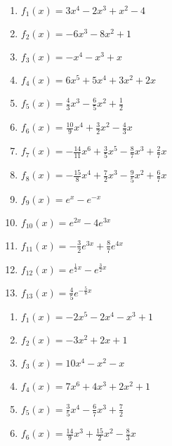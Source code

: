 \begin{minipage}{\textwidth}
	\begin{minipage}{.4\textwidth}
		\begin{Exercise}[title={\raggedright Bestimme jeweils eine Stammfunktion.}, label=stammfunktionenA1]
			\begin{enumerate}[label=\alph*)]
				\item \(f_1(x)=3x^4-2x^3+x^2-4\)
				\item \(f_2(x)=-6x^3-8x^2+1\)
				\item \(f_3(x)=-x^4-x^3+x\)
				\item \(f_4(x)=6x^5+5x^4+3x^2+2x\)
				\item \(f_5(x)=\frac{4}{3}x^3-\frac{6}{5}x^2+\frac{1}{2}\)
				\item \(f_6(x)=\frac{10}{9}x^4+\frac{3}{2}x^2-\frac{4}{3}x\)
				\item \(f_7(x)=-\frac{14}{11}x^6+\frac{3}{5}x^5-\frac{8}{7}x^3+\frac{2}{7}x\)
				\item \(f_8(x)=-\frac{15}{8}x^4+\frac{7}{2}x^3-\frac{9}{5}x^2+\frac{6}{7}x\)
				\item \(f_9(x)=e^x-e^{-x}\)
				\item \(f_{10}(x)=e^{2x}-4e^{3x}\)
				\item \(f_{11}(x)=-\frac{3}{2}e^{3x}+\frac{8}{7}e^{4x}\)
				\item \(f_{12}(x)=e^{\frac{1}{2}x}-e^{\frac{3}{2}x}\)
				\item \(f_{13}(x)=\frac{4}{5}e^{-\frac{5}{8}x}\)
			\end{enumerate}
		\end{Exercise}
	\end{minipage}
	\begin{minipage}{.1\textwidth}
		\phantom{text}
	\end{minipage}
	\begin{minipage}{.4\textwidth}
		\begin{Exercise}[title={\raggedright Bestimme jeweils alle Stammfunktionen.}, label=stammfunktionenA2]
			\begin{enumerate}[label=\alph*)]
				\item \(f_1(x)=-2x^5-2x^4-x^3+1\)
				\item \(f_2(x)=-3x^2+2x+1\)
				\item \(f_3(x)=10x^4-x^2-x\)
				\item \(f_4(x)=7x^6+4x^3+2x^2+1\)
				\item \(f_5(x)=\frac{3}{5}x^4-\frac{6}{7}x^3+\frac{7}{2}\)
				\item \(f_6(x)=\frac{14}{9}x^3+\frac{15}{2}x^2-\frac{8}{3}x\)

\end{enumerate}
\end{Exercise}
\end{minipage}
\end{minipage}
